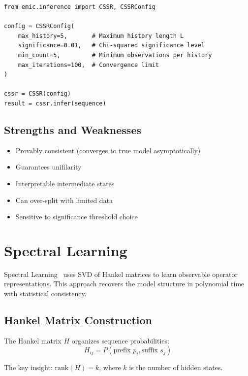 \documentclass[11pt,a4paper]{report}
\theoremstyle{definition}
\theoremstyle{plain}
\begin{document}
\begin{lstlisting}[caption={CSSR configuration}]
from emic.inference import CSSR, CSSRConfig

config = CSSRConfig(
    max_history=5,       # Maximum history length L
    significance=0.01,   # Chi-squared significance level
    min_count=5,         # Minimum observations per history
    max_iterations=100,  # Convergence limit
)

cssr = CSSR(config)
result = cssr.infer(sequence)
\end{lstlisting}

\subsection{Strengths and Weaknesses}

\begin{itemize}
    \item[\checkmark] Provably consistent (converges to true model asymptotically)
    \item[\checkmark] Guarantees unifilarity
    \item[\checkmark] Interpretable intermediate states
    \item[$\times$] Can over-split with limited data
    \item[$\times$] Sensitive to significance threshold choice
\end{itemize}

\section{Spectral Learning}

Spectral Learning~\cite{hsu2012spectral,boots2011closing} uses SVD of Hankel matrices to learn observable operator representations. This approach recovers the model structure in polynomial time with statistical consistency.

\subsection{Hankel Matrix Construction}

The Hankel matrix $H$ organizes sequence probabilities:
\begin{equation}
    H_{ij} = P(\text{prefix } p_i, \text{suffix } s_j)
\end{equation}

The key insight: $\text{rank}(H) = k$, where $k$ is the number of hidden states.
\end{document}
